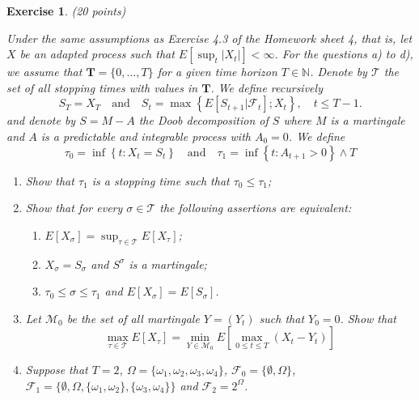 \documentclass[DIV=classic,a4paper,10pt]{scrartcl}
\newtheorem{exercise}[theorem]{Exercise}
\theoremstyle{nonumberplain}
\numberwithin{equation}{section}
\begin{document}
\begin{exercise}(20 points)

    Under the same assumptions as Exercise 4.3 of the Homework sheet 4, that is, let $X$ be an adapted process such that $E[\sup_t |X_t|]<\infty$.
    For the questions a) to d), we assume that $\mathbf{T}=\{0,\ldots,T\}$ for a given time horizon $T \in\mathbb{N}$.
    Denote by $\mathcal{T}$ the set of all stopping times with values in $\mathbf{T}$.
    We define recursively
    \begin{equation*}
        S_T=X_T\quad \text{and}\quad S_t=\max \left\{ E\left[ S_{t+1}|\mathcal{F}_t \right];X_t \right\}, \quad t\leq T-1.
    \end{equation*}
    and denote by $S=M-A$ the Doob decomposition of $S$ where $M$ is a martingale and $A$ is a predictable and integrable process with $A_0=0$.
    We define
    \begin{equation*}
        \tau_0=\inf\left\{ t\colon X_t=S_t \right\}\quad \text{and}\quad \tau_1=\inf\left\{ t\colon A_{t+1}>0 \right\}\wedge T
    \end{equation*}
    \begin{enumerate}[label=\text{\alph*)}, fullwidth]
        \item Show that $\tau_1$ is a stopping time such that $\tau_0\leq \tau_1$;
        \item Show that for every $\sigma \in \mathcal{T}$ the following assertions are equivalent:
            \begin{enumerate}[label=\textit{(\roman*)}]
                \item $E[X_\sigma]=\sup_{\tau \in \mathcal{T}}E[X_\tau]$;
                \item $X_\sigma=S_{\sigma}$ and $S^\sigma$ is a martingale;
                \item $\tau_0\leq \sigma\leq \tau_1$ and $E[X_{\sigma}]=E[S_{\sigma}]$.
            \end{enumerate}
        \item Let $\mathcal{M}_0$ be the set of all martingale $Y=(Y_t)$ such that $Y_0=0$.
            Show that
            \begin{equation*}
                \max_{\tau \in \mathcal{T}}E\left[ X_\tau \right]=\min_{Y \in \mathcal{M}_0}E\left[ \max_{0\leq t\leq T } \left( X_t-Y_t \right)\right]
            \end{equation*}
        \item Suppose that $T=2$, $\Omega=\{\omega_1,\omega_2,\omega_3,\omega_4\}$, $\mathcal{F}_0=\{\emptyset,\Omega\}$, $\mathcal{F}_1=\{\emptyset, \Omega, \{\omega_1,\omega_2\}, \{\omega_3,\omega_4\}\}$ and $\mathcal{F}_2=2^\Omega$.

\end{enumerate}
\end{exercise}
\end{document}
